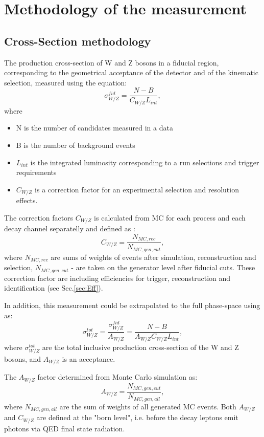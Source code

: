 \chapter{Methodology of the measurement}\label{chap:Met}
\minitoc
\section{Cross-Section methodology}

The production cross-section of W and Z bosons in a fiducial region, corresponding to the geometrical acceptance of the detector and of the kinematic selection, measured using the  equation:
\begin{equation}
\sigma^{fid}_{W/Z} = \frac{N-B}{C_{W/Z}L_{int}},
\end{equation}
where 
\begin{itemize}
\item N is the number of candidates measured in a data
\item B is the number of background events
\item $L_{int}$ is the integrated luminosity corresponding to a run selections and trigger requirements
\item $C_{W/Z}$ is a correction factor for an experimental selection and resolution effects.
\end{itemize}

The correction factors $C_{W/Z}$ is calculated from MC for each process and each decay channel separatelly and defined as :
\begin{equation}
C_{W/Z}=\frac{N_{MC, rec}}{N_{MC,gen, cut}}, 
\end{equation}
where $N_{MC, rec}$ are sums of weights of events after simulation, reconstruction and selection, $N_{MC,gen, cut}$ - are taken on the generator level after fiducial cuts. These correction factor are including efficiencies for trigger, reconstruction and identification (see Sec.\ref{sec:Eff}).

In addition, this measurement could be extrapolated to the full phase-space using as:
\begin{equation}
\sigma^{tot}_{W/Z}= \frac{\sigma^{fid}_{W/Z}}{A_{W/Z}}= \frac{N-B}{A_{W/Z}C_{W/Z}L_{int}},
\end{equation}
where $\sigma^{tot}_{W/Z}$ are the total inclusive production cross-section of the W and Z bosons, and $A_{W/Z}$  is an acceptance. 

The $A_{W/Z}$ factor determined from Monte Carlo simulation as: 
\begin{equation}
A_{W/Z}=\frac{N_{MC,gen, cut}}{N_{MC,gen,all}},
\end{equation}
where $N_{MC,gen,all}$ are the sum of weights of all generated MC events. Both $A_{W/Z}$ and $C_{W/Z}$ are defined at the "born level", i.e. before the decay leptons emit photons via QED final state radiation.

